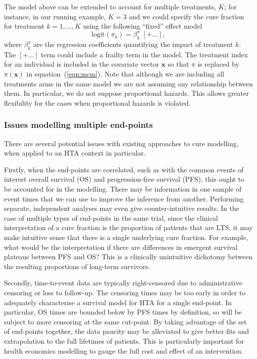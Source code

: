 \documentclass[AMA,STIX1COL]{WileyNJD-v2}
\begin{document}
The model above can be extended to account for multiple treatments, $K$; for instance, in our running example, $K=3$ and we could specify the cure fraction for treatment $k=1,\ldots,K$ using the following ``fixed'' effect model
\begin{equation}
\label{eqn:pi_regn}
\mbox{logit}(\pi_{k}) = \beta^{\pi}_{k} \; [+ \ldots],
\end{equation}
\noindent
where $\beta^{\pi}_k$ are the regression coefficients quantifying the impact of treatment $k$.
The $[+ \ldots]$ term could include a frailty term in the model.
The treatment index for an individual is included in the covariate vector $\bm{x}$ so that $\pi$ is replaced by $\pi(\bm{x})$ in equation~(\ref{eqn:mcm}).
Note that although we are including all treatments arms in the same model we are not assuming any relationship between them. In particular, we do not suppose proportional hazards. This allows greater flexibility for the cases when proportional hazards is violated.

\subsubsection{Issues modelling multiple end-points} \label{sec:issues}
There are several potential issues with existing approaches to cure modelling, when applied to an HTA context in particular.

Firstly, when the end-points are correlated, such as with the common events of interest overall survival (OS) and progression-free survival (PFS), this ought to be accounted for in the modelling. There may be information in one sample of event times that we can use to improve the inference from another. Performing separate, independent analyses may even give counter-intuitive results. In the case of multiple types of end-points in the same trial, since the clinical interpretation of a cure fraction is the proportion of patients that are LTS, it may make intuitive sense that there is a single underlying cure fraction. For example, what would be the interpretation if there are differences in emergent survival plateaus between PFS and OS? This is a clinically unintuitive dichotomy between the resulting proportions of long-term survivors.

Secondly, time-to-event data are typically right-censored due to administrative censoring or loss to follow-up.
The censoring times may be too early in order to adequately characterise a survival model for HTA for a single end-point. In particular, OS times are bounded below by PFS times by definition, so will be subject to more censoring at the same cut-point. By taking advantage of the set of end-points together, the data paucity may be alleviated to give better fits and extrapolation to the full lifetimes of patients. This is particularly important for health economics modelling to gauge the full cost and effect of an intervention.
\end{document}
